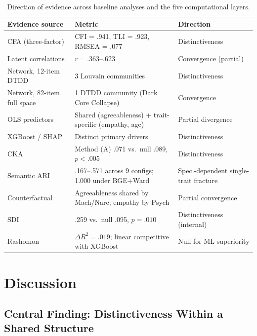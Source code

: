 \documentclass[11pt,twocolumn]{article}
\begin{document}
\begin{table}[!t]
\centering
\caption{Direction of evidence across baseline analyses and the five computational layers.}
\label{tab:evidence}
\footnotesize
\begin{tabular}{p{3.2cm}p{5.2cm}p{4.0cm}}
\toprule
Evidence source & Metric & Direction \\
\midrule
CFA (three-factor) & CFI = .941, TLI = .923, RMSEA = .077 & Distinctiveness \\
Latent correlations & $r = .363$--$.623$ & Convergence (partial) \\
Network, 12-item DTDD & 3 Louvain communities & Distinctiveness \\
Network, 82-item full space & 1 DTDD community (Dark Core Collapse) & Convergence \\
OLS predictors & Shared (agreeableness) + trait-specific (empathy, age) & Partial divergence \\
XGBoost / SHAP & Distinct primary drivers & Distinctiveness \\
CKA & Method (A) .071 vs.\ null .089, $p < .005$ & Distinctiveness \\
Semantic ARI & .167--.571 across 9 configs; 1.000 under BGE+Ward & Spec.-dependent single-trait fracture \\
Counterfactual & Agreeableness shared by Mach/Narc; empathy by Psych & Partial convergence \\
SDI & .259 vs.\ null .095, $p = .010$ & Distinctiveness (internal) \\
Rashomon & $\Delta R^2 = .019$; linear competitive with XGBoost & Null for ML superiority \\
\bottomrule
\end{tabular}
\end{table}

\section{Discussion}

\subsection{Central Finding: Distinctiveness Within a Shared Structure}
\end{document}
